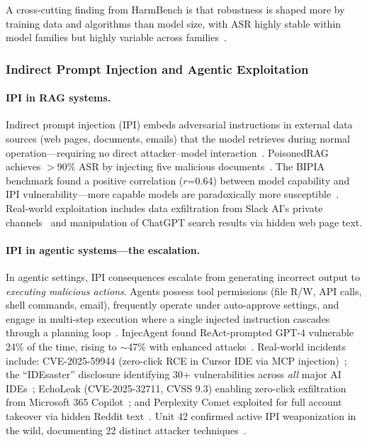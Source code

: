A cross-cutting finding from HarmBench is that robustness is shaped more by training data and algorithms than model size, with ASR highly stable within model families but highly variable across families~\cite{mazeika2024harmbench}.


\subsubsection{Indirect Prompt Injection and Agentic Exploitation}
\label{sec:threat-ipi}

\paragraph{IPI in RAG systems.}
Indirect prompt injection (IPI) embeds adversarial instructions in external data sources (web pages, documents, emails) that the model retrieves during normal operation---requiring no direct attacker--model interaction~\cite{greshake2023ipi}. PoisonedRAG achieves $>$90\% ASR by injecting five malicious documents~\cite{zou2025poisonedrag}. The BIPIA benchmark found a positive correlation ($r$=0.64) between model capability and IPI vulnerability---more capable models are paradoxically more susceptible~\cite{yi2025bipia}. Real-world exploitation includes data exfiltration from Slack AI's private channels~\cite{promptarmor2024slack} and manipulation of ChatGPT search results via hidden web page text.

\paragraph{IPI in agentic systems---the escalation.}
In agentic settings, IPI consequences escalate from generating incorrect output to \emph{executing malicious actions}. Agents possess tool permissions (file R/W, API calls, shell commands, email), frequently operate under auto-approve settings, and engage in multi-step execution where a single injected instruction cascades through a planning loop~\cite{schneider2025promptware}. InjecAgent found ReAct-prompted GPT-4 vulnerable 24\% of the time, rising to $\sim$47\% with enhanced attacks~\cite{zhan2024injecagent}. Real-world incidents include: CVE-2025-59944 (zero-click RCE in Cursor IDE via MCP injection)~\cite{lakera2025cursor}; the ``IDEsaster'' disclosure identifying 30+ vulnerabilities across \emph{all} major AI IDEs~\cite{idesaster2025}; EchoLeak (CVE-2025-32711, CVSS 9.3) enabling zero-click exfiltration from Microsoft 365 Copilot~\cite{echoleak2025}; and Perplexity Comet exploited for full account takeover via hidden Reddit text~\cite{brave2025comet}. Unit 42 confirmed active IPI weaponization in the wild, documenting 22 distinct attacker techniques~\cite{unit42ipi2026}.

